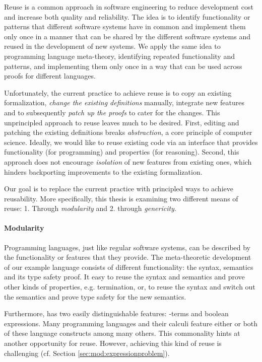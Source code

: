 {Reuse is a common approach in software engineering to reduce development cost
and increase both quality and reliability. The idea is to identify functionality
or patterns that different software systems have in common and implement them
only once in a manner that can be shared by the different software systems and
reused in the development of new systems. We apply the same idea to programming
language meta-theory, identifying repeated functionality and patterns, and
implementing them only once in a way that can be used across proofs for
different languages.

Unfortunately, the current practice to achieve reuse is to copy an existing
formalization, \emph{change the existing definitions} manually, integrate new
features and to subsequently \emph{patch up the proofs} to cater for the
changes. This unprincipled approach to reuse leaves much to be desired. First,
editing and patching the existing definitions breaks \emph{abstraction}, a core
principle of computer science. Ideally, we would like to reuse existing code via
an interface that provides functionality (for programming) and properties (for
reasoning). Second, this approach does not encourage \emph{isolation} of new
features from existing ones, which hinders backporting improvements to the
existing formalization.

Our goal is to replace the current practice with principled ways to achieve
reusability. More specifically, this thesis is examining two different means of
reuse: 1. Through \emph{modularity} and 2. through \emph{genericity}.

\paragraph{Modularity}
Programming languages, just like regular software systems, can be described by
the functionality or features that they provide. The meta-theoretic development
of our example language \stlcbool consists of different functionality: the
syntax, semantics and its type safety proof. It easy to reuse the syntax and
semantics and prove other kinds of properties, e.g. termination, or, to reuse
the syntax and switch out the semantics and prove type safety for the new
semantics.

Furthermore, \stlcbool has two easily distinguishable features:
\textlambda-terms and boolean expressions. Many programming languages and their
calculi feature either or both of these language constructs among many others.
This commonality hints at another opportunity for reuse. However, achieving this
kind of reuse is challenging (cf. Section \ref{sec:mod:expressionproblem}).

}
